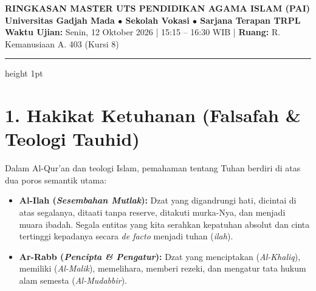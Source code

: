 \documentclass[10pt,a4paper]{article}
\begin{document}
\begin{center}
  {\LARGE\bfseries\color{ugmblue}RINGKASAN MASTER UTS PENDIDIKAN AGAMA ISLAM (PAI)}\\[3pt]
  {\small\bfseries\color{navyaccent}Universitas Gadjah Mada $\bullet$ Sekolah Vokasi $\bullet$ Sarjana Terapan TRPL}\\[2pt]
  {\footnotesize\color{textdark}\textbf{Waktu Ujian:} Senin, 12 Oktober 2026 | 15:15 -- 16:30 WIB | \textbf{Ruang:} R. Kemanusiaan A. 403 (Kursi 8)}
\end{center}
\vspace{-2mm}
\hrule height 1pt
\vspace{3mm}

\section*{\color{ugmblue}\Large 1. Hakikat Ketuhanan (Falsafah \& Teologi Tauhid)}

\begin{conceptbox}
Dalam Al-Qur'an dan teologi Islam, pemahaman tentang Tuhan berdiri di atas dua poros semantik utama:
\begin{itemize}
  \item \textbf{Al-Ilah (\textit{Sesembahan Mutlak}):} Dzat yang digandrungi hati, dicintai di atas segalanya, ditaati tanpa reserve, ditakuti murka-Nya, dan menjadi muara ibadah. Segala entitas yang kita serahkan kepatuhan absolut dan cinta tertinggi kepadanya secara \textit{de facto} menjadi tuhan (\textit{ilah}).
  \item \textbf{Ar-Rabb (\textit{Pencipta \& Pengatur}):} Dzat yang menciptakan (\textit{Al-Khaliq}), memiliki (\textit{Al-Malik}), memelihara, memberi rezeki, dan mengatur tata hukum alam semesta (\textit{Al-Mudabbir}).
\end{itemize}
\end{conceptbox}
\end{document}
